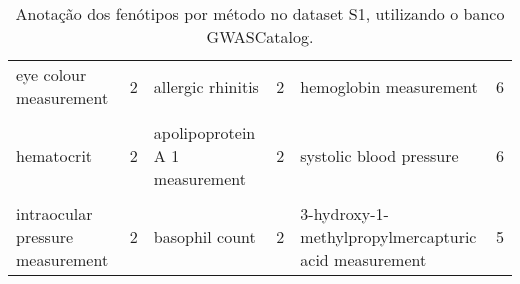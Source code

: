 \begin{table}[!htbp]
{\begin{tabular}[t]{lrlrlr}
eye colour measurement & 2 & allergic rhinitis & 2 & hemoglobin measurement & 6\\
\cellcolor{gray!6}{glomerular filtration rate} & \cellcolor{gray!6}{2} & \cellcolor{gray!6}{antioxidant measurement} & \cellcolor{gray!6}{2} & \cellcolor{gray!6}{response to bronchodilator} & \cellcolor{gray!6}{6}\\
hematocrit & 2 & apolipoprotein A 1 measurement & 2 & systolic blood pressure & 6\\
\cellcolor{gray!6}{intelligence} & \cellcolor{gray!6}{2} & \cellcolor{gray!6}{autism spectrum disorder} & \cellcolor{gray!6}{2} & \cellcolor{gray!6}{urate measurement} & \cellcolor{gray!6}{6}\\
intraocular pressure measurement & 2 & basophil count & 2 & \makecell[l]{3-hydroxy-1-methylpropylmercapturic\\acid measurement} & 5\\
\bottomrule
\end{tabular}}

\caption{Anotação dos fenótipos por método no dataset S1, utilizando o banco GWASCatalog.}
\label{tab:ds1_gwas_persnp_annot}

\end{table}
